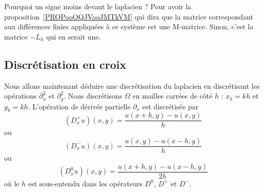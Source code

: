 \begin{remark}
	Pourquoi un signe moins devant le laplacien ? Pour avoir la proposition~\ref{PROPooOQJVooJMTkVM} qui dira que la matrice correspondant aux différences finies appliquées à ce système est une M-matrice. Sinon, c'est la matrice \(-L_h\) qui en serait une.
\end{remark}

\subsection{Discrétisation en croix}

Nous allons maintenant déduire une discrétisation du laplacien en discrétisant les opérations \( \partial^2_x\) et \( \partial^2_y\). Nous discrétisons \( \Omega\) en mailles carrées de côté \( h\) : \( x_k=kh\) et \( y_k=kh\). L'opération de dérivée partielle \( \partial_x\) est discrétisée par
\begin{equation}
	(D_x^+u)(x,y)=\frac{ u(x+h,y)-u(x,y) }{ h }
\end{equation}
ou
\begin{equation}
	(D_x^-u)(x,y)=\frac{ u(x,y)-u(x-h,y) }{ h }
\end{equation}
ou
\begin{equation}
	(D^0_xu)(x,y)=\frac{ u(x+h,y)-u(x-h,y) }{ 2h }
\end{equation}
où le \( h\) est sous-entendu dans les opérateurs \( D^0\), \( D^+\) et \( D^-\).

